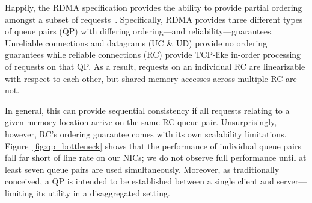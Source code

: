 Happily, the RDMA specification provides the ability to provide
partial ordering amongst a subset of requests~\cite{infiniband-spec}.
Specifically, RDMA provides three different types of queue pairs (QP)
with differing ordering---and reliability---guarantees. Unreliable
connections and datagrams (UC \& UD) provide no ordering guarantees
while reliable connections (RC) provide TCP-like in-order processing
of requests on that QP.  As a result, requests on an individual RC are
linearizable with respect to each other, but shared memory accesses
across multiple RC are not.
%
%


In general, this can provide sequential consistency if all requests
relating to a given memory location arrive on the same RC queue pair.
Unsurprisingly, however, RC's ordering guarantee comes with its own
scalability limitations.  Figure~\ref{fig:qp_bottleneck} shows that
the performance of individual queue pairs fall far short of line rate
on our NICs; we do not observe full performance until at least seven queue pairs are used simultaneously.  Moreover, as traditionally
conceived, a QP is intended to be established between a single client
and server---limiting its utility in a disaggregated setting.




